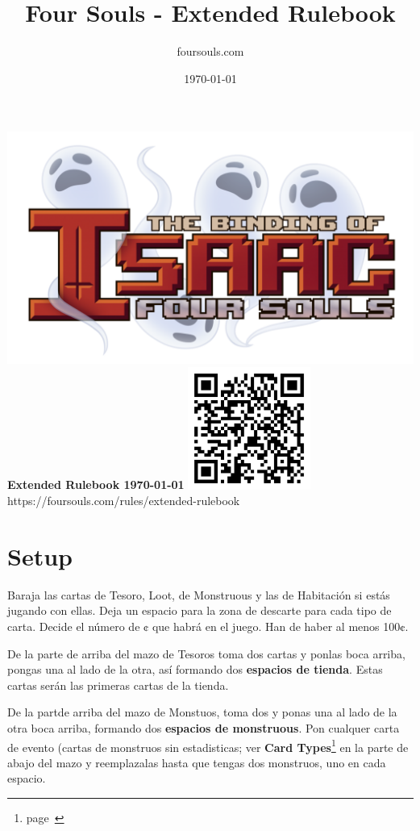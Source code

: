 \documentclass[
  fontsize=10pt,
  paper=a5,
  version=last,
  chapterprefix=true,
  bindingoffset=5mm,
  ]{scrbook}
\title{Four Souls - Extended Rulebook}
\author{foursouls.com}
\date{\today}
\begin{document}
    \begin{titlepage}
        \centering
        \includegraphics[width=\textwidth]{assets/foursouls.png}\\
        {\bfseries\LARGE
        Extended Rulebook
        \vfill
        \Large\today
        }
        \vfill
        \includegraphics[width=4cm]{assets/qr-code.pdf}\\
        https://foursouls.com/rules/extended-rulebook
    \end{titlepage}

    \tableofcontents

    \chapter{Setup}
    \label{setup}
    Baraja las cartas de Tesoro, Loot, de Monstruous y las de Habitación si estás jugando con ellas. Deja un espacio para la zona de descarte para cada tipo de carta.
    Decide el número de ¢ que habrá en el juego. Han de haber al menos 100¢.

    De la parte de arriba del mazo de Tesoros toma dos cartas y ponlas boca arriba, pongas una al lado de la otra, así formando dos \textbf{espacios de tienda}. Estas cartas serán las primeras cartas de la tienda.

    De la partde arriba del mazo de Monstuos, toma dos y ponas una al lado de la otra boca arriba, formando dos \textbf{espacios de monstruous}. Pon cualquer carta de evento (cartas de monstruos sin estadisticas; ver \textbf{Card Types}\footnote{page~\pageref{types}} en la parte de abajo del mazo y reemplazalas hasta que tengas dos monstruos, uno en cada espacio.
\end{document}
